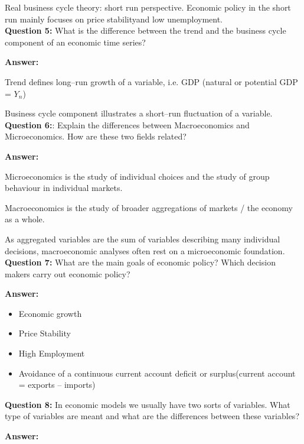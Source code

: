 \documentclass[a4paper, 11pt]{article}
\begin{document}
Real business cycle theory: short run perspective. Economic policy in the short run mainly focuses on price stabilityand low unemployment. \\

\textbf{Question 5:} What is the difference between the trend and the business cycle component of an economic time series? 

\textbf{Answer:}

Trend defines long--run growth of a variable, i.e. GDP (natural or potential GDP = $Y_{n}$)

Business cycle component illustrates a short--run fluctuation of a variable. \\

\textbf{Question 6:}: Explain the differences between Macroeconomics and Microeconomics. How are these two fields related? 

\textbf{Answer:} 

Microeconomics is the study of individual choices and the study of group behaviour in individual markets.

Macroeconomics is the study of broader aggregations of markets / the economy as a whole.

As aggregated variables are the sum of variables describing many individual decisions, macroeconomic analyses often rest on a microeconomic foundation. \\

\textbf{Question 7:} What are the main goals of economic policy? Which decision makers carry out economic policy? 

\textbf{Answer:} 
\begin{itemize}

\item Economic growth

\item Price Stability

\item High Employment

\item Avoidance of a continuous current account deficit or surplus(current account = exports – imports) \\

\end{itemize}

\textbf{Question 8:} In economic models we usually have two sorts of variables. What type of variables are meant and what are the differences between these variables? 

\textbf{Answer:} 
\end{document}
